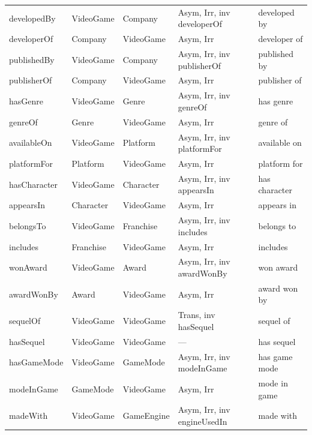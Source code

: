 \begin{longtable}{lllll}
developedBy        & VideoGame & Company     & Asym, Irr, inv developerOf            & developed by \\
developerOf        & Company   & VideoGame   & Asym, Irr                             & developer of \\
publishedBy        & VideoGame & Company     & Asym, Irr, inv publisherOf            & published by \\
publisherOf        & Company   & VideoGame   & Asym, Irr                             & publisher of \\
hasGenre           & VideoGame & Genre       & Asym, Irr, inv genreOf                & has genre \\
genreOf            & Genre     & VideoGame   & Asym, Irr                             & genre of \\
availableOn        & VideoGame & Platform    & Asym, Irr, inv platformFor            & available on \\
platformFor        & Platform  & VideoGame   & Asym, Irr                             & platform for \\
hasCharacter       & VideoGame & Character   & Asym, Irr, inv appearsIn              & has character \\
appearsIn          & Character & VideoGame   & Asym, Irr                             & appears in \\
belongsTo          & VideoGame & Franchise   & Asym, Irr, inv includes               & belongs to \\
includes           & Franchise & VideoGame   & Asym, Irr                             & includes \\
wonAward           & VideoGame & Award       & Asym, Irr, inv awardWonBy             & won award \\
awardWonBy         & Award     & VideoGame   & Asym, Irr                             & award won by \\
sequelOf           & VideoGame & VideoGame   & Trans, inv hasSequel                  & sequel of \\
hasSequel          & VideoGame & VideoGame   & ---                                   & has sequel \\
hasGameMode        & VideoGame & GameMode    & Asym, Irr, inv modeInGame             & has game mode \\
modeInGame         & GameMode  & VideoGame   & Asym, Irr                             & mode in game \\
madeWith           & VideoGame & GameEngine  & Asym, Irr, inv engineUsedIn           & made with \\

\end{longtable}
